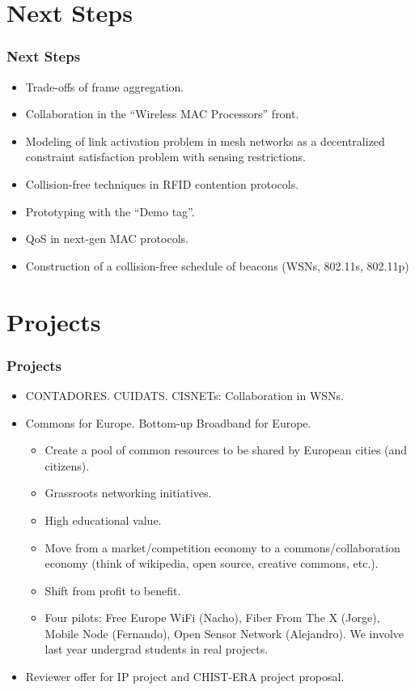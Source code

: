 \documentclass{beamer}
\begin{document}
\section{Next Steps}
\begin{frame}
  \frametitle{Next Steps}
      \begin{block}{}
        \begin{itemize}
          \item \alert<2>{Trade-offs of frame aggregation.}
          \item Collaboration in the ``Wireless MAC Processors'' front.
          \item Modeling of link activation problem in mesh networks as a decentralized constraint satisfaction problem with sensing restrictions.
          \item Collision-free techniques in RFID contention protocols.
          \item Prototyping with the ``Demo tag''.
          \item QoS in next-gen MAC protocols.
          \item Construction of a collision-free schedule of beacons (WSNs, 802.11s, 802.11p)
        \end{itemize}
      \end{block}
\end{frame}


\section{Projects}
\begin{frame}
  \frametitle{Projects}
      \begin{block}{}
        \begin{itemize}
          \item CONTADORES. CUIDATS. CISNETs: Collaboration in WSNs.
          \item Commons for Europe. Bottom-up Broadband for Europe.          \begin{itemize}
              \item Create a pool of common resources to be shared by European cities (and citizens).
              \item Grassroots networking initiatives.
              \item High educational value.
              \item Move from a market/competition economy to a commons/collaboration economy (think of wikipedia, open source, creative commons, etc.).
              \item Shift from profit to benefit.
              \item Four pilots: Free Europe WiFi (Nacho), Fiber From The X (Jorge), Mobile Node (Fernando), Open Sensor Network (Alejandro). We involve last year undergrad students in real projects.
          \end{itemize}
          \item Reviewer offer for IP project and CHIST-ERA project proposal.
        \end{itemize}
      \end{block}
\end{frame}
\end{document}
